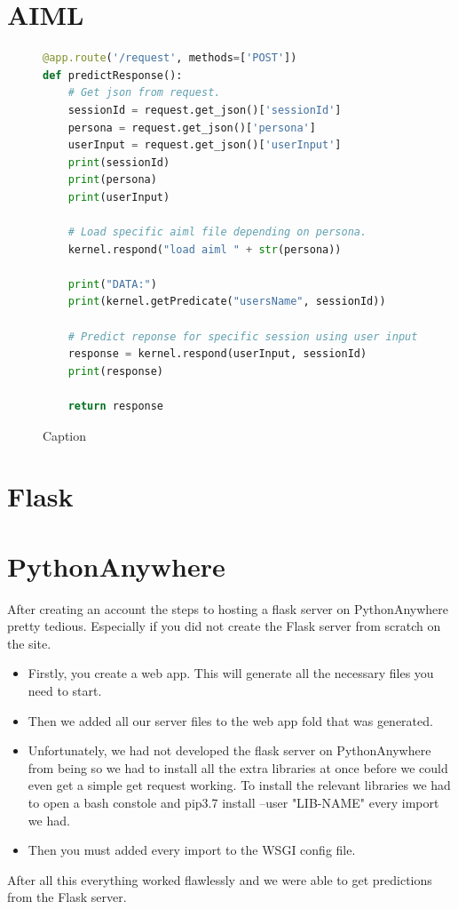 \section{AIML}
\begin{figure}[!h]
    \centering
    \begin{lstlisting}[language=PYTHON]
@app.route('/request', methods=['POST'])
def predictResponse():
    # Get json from request.
    sessionId = request.get_json()['sessionId']
    persona = request.get_json()['persona']
    userInput = request.get_json()['userInput']
    print(sessionId)
    print(persona)
    print(userInput)

    # Load specific aiml file depending on persona.
    kernel.respond("load aiml " + str(persona))

    print("DATA:")
    print(kernel.getPredicate("usersName", sessionId))

    # Predict reponse for specific session using user input.
    response = kernel.respond(userInput, sessionId)
    print(response)

    return response

\end{lstlisting}
    \caption{Caption}
    \label{fig:my_label}
\end{figure}


\section{Flask}

\section{PythonAnywhere}
After creating an account the steps to hosting a flask server on PythonAnywhere pretty tedious. Especially if you did not create the Flask server from scratch on the site.

\begin{itemize}
    \item Firstly, you create a web app. This will generate all the necessary files you need to start.
    \item Then we added all our server files to the web app fold that was generated.
    \item Unfortunately, we had not developed the flask server on PythonAnywhere from being so we had to install all the extra libraries at once before we could even get a simple get request working. To install the relevant libraries we had to open a bash constole and pip3.7 install --user "LIB-NAME" every import we had.
    \item Then you must added every import to the WSGI config file.
\end{itemize}
After all this everything worked flawlessly and we were able to get predictions from the Flask server.


